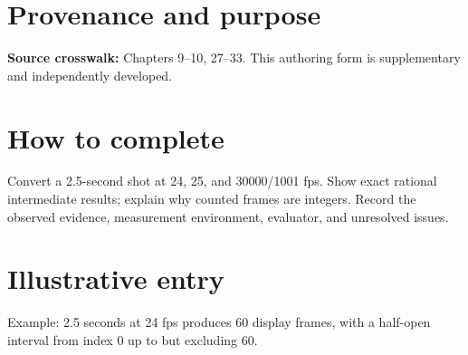 \documentclass[10pt,letterpaper]{article}
\begin{document}
\makedoctitle
\makedocsummary

\section{Provenance and purpose}
\textbf{Source crosswalk:} Chapters 9--10, 27--33. This authoring form is supplementary and independently developed.
\section{How to complete}
Convert a 2.5-second shot at 24, 25, and 30000/1001 fps. Show exact rational intermediate results; explain why counted frames are integers. Record the observed evidence, measurement environment, evaluator, and unresolved issues. 
\section{Illustrative entry}
Example: 2.5 seconds at 24 fps produces 60 display frames, with a half-open interval from index 0 up to but excluding 60.
\end{document}
